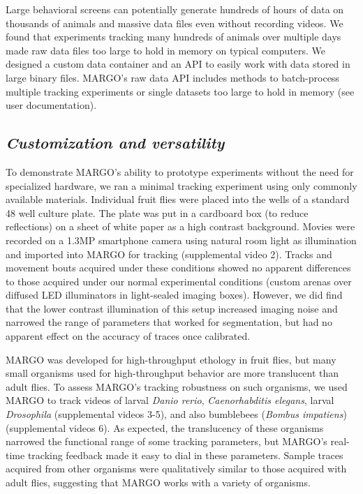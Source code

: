 \documentclass[12pt,letterpaper]{article}
\begin{document}
Large behavioral screens can potentially generate hundreds of hours of data on thousands of animals and massive data files even without recording videos. We found that experiments tracking many hundreds of animals over multiple days made raw data files too large to hold in memory on typical computers. We designed a custom data container and an API to easily work with data stored in large binary files. MARGO's raw data API includes methods to batch-process multiple tracking experiments or single datasets too large to hold in memory (see user documentation). 

\subsection*{\textit{Customization and versatility}}

To demonstrate MARGO's ability to prototype experiments without the need for specialized hardware, we ran a minimal tracking experiment using only commonly available materials. Individual fruit flies were placed into the wells of a standard 48 well culture plate. The plate was put in a cardboard box (to reduce reflections) on a sheet of white paper as a high contrast background. Movies were recorded on a 1.3MP smartphone camera using natural room light as illumination and imported into MARGO for tracking (supplemental video 2). Tracks and movement bouts acquired under these conditions showed no apparent differences to those acquired under our normal experimental conditions (custom arenas over diffused LED illuminators in light-sealed imaging boxes). However, we did find that the lower contrast illumination of this setup increased imaging noise and narrowed the range of parameters that worked for segmentation, but had no apparent effect on the accuracy of traces once calibrated.

MARGO was developed for high-throughput ethology in fruit flies, but many small organisms used for high-throughput behavior are more translucent than adult flies. To assess MARGO’s tracking robustness on such organisms, we used MARGO to track videos of larval \emph{Danio rerio}, \emph{Caenorhabditis elegans}, larval \emph{Drosophila} (supplemental videos 3-5), and also bumblebees (\emph{Bombus impatiens}) (supplemental videos 6). As expected, the translucency of these organisms narrowed the functional range of some tracking parameters, but MARGO's real-time tracking feedback made it easy to dial in these parameters. Sample traces acquired from other organisms were qualitatively similar to those acquired with adult flies, suggesting that MARGO works with a variety of organisms.
\end{document}
